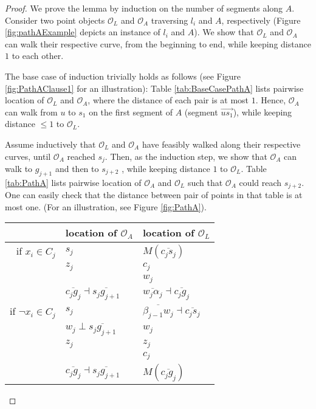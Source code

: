 \documentclass[a4paper,UKenglish]{lipics}
\newcommand{\CS}{{\mathscr S}}
\newcommand{\CO}{{\mathscr O}}
\newcommand{\CQ}{{\mathscr Q}}
\newcommand{\cfev}{{l}} \newcommand{\sq}{{\CS\CQ}}
\newcommand{\Seg}[1]{{\overline{#1}}}
\newcommand{\Dir}{\overrightarrow}
\begin{document}
\begin{proof}

We prove the lemma by induction on the number of segments along $A$. 
Consider two point objects $\CO_L$ and $\CO_A$ 
traversing $\cfev_i$ and $A$, respectively (Figure \ref{fig:pathAExample} depicts an instance of $\cfev_i$ and $A$).
We show that $\CO_L$ and $\CO_A$ can walk
their respective curve, from the beginning to
 end, while keeping distance $1$ to each other. 

The base case of induction trivially holds as follows 
(see Figure \ref{fig:PathAClause1} for an illustration):
Table \ref{tab:BaseCasePathA} lists  pairwise location of 
$\CO_L$ and $\CO_A$, where the distance of each pair is at most $1$.
Hence, $\CO_A$ can walk from $u$ to $s_1$ on the 
first segment of $A$ (segment $\Dir{us_1}$), 
while keeping distance $\le 1$ to $\CO_L$.


Assume inductively that $\CO_L$ and $\CO_A$ have feasibly walked along 
their respective curves, until $\CO_A$ reached $s_j$.
Then, as the induction step, 
we 
show that
$\CO_A$ can walk to $g_{j+1}$ and then to $s_{j+2}$ 
, while keeping distance $1$ to $\CO_L$.
Table \ref{tab:PathA} lists pairwise location 
of $\CO_A$ and $\CO_L$ such that $\CO_A$ could reach  $s_{j+2}$.
One can easily check that the distance between pair of points 
in that table is at most one.
 (For an illustration, see Figure \ref{fig:PathA}). 


\begin{table}[h]
\centering
\begin{tabular}{ r | l | l  }
  & location of $\CO_A$ & location of $\CO_L$  
 \\
\hline
   if $x_i \in C_j$  & $s_j$ & $M(\Seg{c_js_j})$\\
	& $z_j$ & $c_j$\\ 
	&  & $w_j$\\ 

	& $\Seg{c_jg_j} \dashv \Seg{s_jg_{j+1}} $ & $\Seg{w_{j}\alpha_{j}} \dashv \Seg{c_{j}g_{j}}$ \\





   if $\neg x_i \in C_j$  & $s_j$ & $\Seg{\beta_{j-1}w_j}	\dashv \Seg{c_js_j}$ \\
	& $w_j \perp \Seg{s_jg_{j+1}}$ &$w_j$\\
	& $z_j$ &$z_j$\\
	& &$c_j$\\
	& $\Seg{c_jg_j} \dashv \Seg{s_jg_{j+1}} $ &$ M(\Seg{c_jg_j}) $\\





\end{tabular}
\end{table}
\end{proof}
\end{document}
